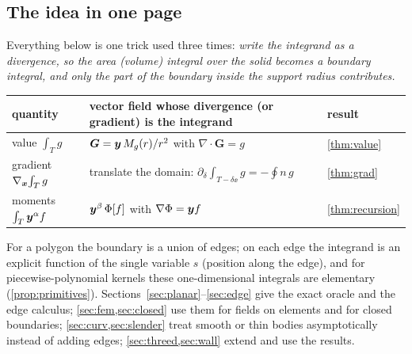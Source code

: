 \subsection{The idea in one page}\label{sec:idea}
Everything below is one trick used three times: \emph{write the integrand as a divergence, so the area (volume)
integral over the solid becomes a boundary integral, and only the part of the boundary inside the support radius
contributes.}
\begin{center}\small
\begin{tabular}{>{\raggedright\arraybackslash}p{3.3cm}>{\raggedright\arraybackslash}p{6.2cm}>{\raggedright\arraybackslash}p{3cm}}
\toprule
quantity & vector field whose divergence (or gradient) is the integrand & result\\
\midrule
value $\int_T g$ & $\bm G=\bm y\,M_g(r)/r^{2}$ with $\nabla\!\cdot\bm G=g$ & \cref{thm:value}\\
gradient $\nabla_{\bm x}\!\int_Tg$ & translate the domain: $\partial_\delta\!\int_{T-\delta\ee}g=-\oint n\,g$ & \cref{thm:grad}\\
moments $\int_T\bm y^\alpha f$ & $\bm y^\beta\,\Phi[f]$ with $\nabla\Phi=\bm y f$ & \cref{thm:recursion}\\
\bottomrule
\end{tabular}
\end{center}
For a polygon the boundary is a union of edges; on each edge the integrand is an explicit function of the single
variable $s$ (position along the edge), and for piecewise-polynomial kernels these one-dimensional integrals are
elementary (\cref{prop:primitives}).  Sections~\ref{sec:planar}--\ref{sec:edge} give the exact oracle and the edge calculus;
\cref{sec:fem,sec:closed} use them for fields on elements and for closed boundaries; \cref{sec:curv,sec:slender}
treat smooth or thin bodies asymptotically instead of adding edges; \cref{sec:threed,sec:wall} extend and use the
results.

